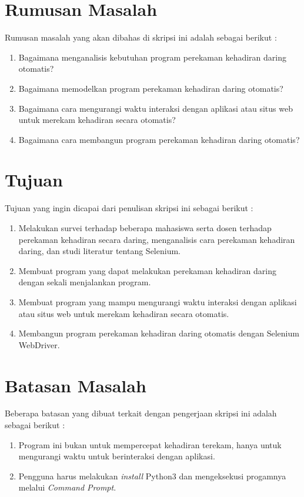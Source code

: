 \section{Rumusan Masalah}
\label{sec:rumusan}
Rumusan masalah yang akan dibahas di skripsi ini adalah sebagai berikut :
\begin{enumerate}
	\item Bagaimana menganalisis kebutuhan program perekaman kehadiran daring otomatis?
	\item Bagaimana memodelkan program perekaman kehadiran daring otomatis?
	\item Bagaimana cara mengurangi waktu interaksi dengan aplikasi atau situs web untuk merekam kehadiran secara otomatis?
	\item Bagaimana cara membangun program perekaman kehadiran daring otomatis?
\end{enumerate}

\section{Tujuan}
\label{sec:tujuan}
Tujuan yang ingin dicapai dari penulisan skripsi ini sebagai berikut :
\begin{enumerate}
	\item Melakukan survei terhadap beberapa mahasiswa serta dosen terhadap perekaman kehadiran secara daring, menganalisis cara perekaman kehadiran daring, dan studi literatur tentang Selenium.
	\item Membuat program yang dapat melakukan perekaman kehadiran daring dengan sekali menjalankan program.
	\item Membuat program yang mampu mengurangi waktu interaksi dengan aplikasi atau situs web untuk merekam kehadiran secara otomatis.
	\item Membangun program perekaman kehadiran daring otomatis dengan Selenium WebDriver.
\end{enumerate}

\section{Batasan Masalah}
\label{sec:batasan}
Beberapa batasan yang dibuat terkait dengan pengerjaan skripsi ini adalah sebagai berikut :
\begin{enumerate}
	\item Program ini bukan untuk mempercepat kehadiran terekam, hanya untuk mengurangi waktu untuk berinteraksi dengan aplikasi.
	\item Pengguna harus melakukan \textit{install} Python3 dan mengeksekusi progamnya melalui \textit{Command Prompt}.
\end{enumerate}


